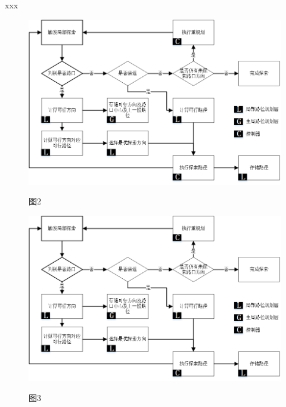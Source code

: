 \documentclass[hyperref]{ctexart}
\begin{document}
		xxx
		\thispagestyle{empty}
		\clearpage
		\setcounter{page}{5}	

	\begin{figure}[htbp]
\qquad		\qquad	\qquad	\qquad	\qquad		\includegraphics[width=0.6\linewidth]{graph/structure.png}
\begin{center}
	图2
\end{center}
\label{fig:02}
\begin{center}
	\quad	\includegraphics[width=0.6\linewidth]{graph/structure.png}
		\begin{center}图3\end{center}
	\label{fig:03}
\end{center}
\end{figure}

	

	










	
\end{document}
